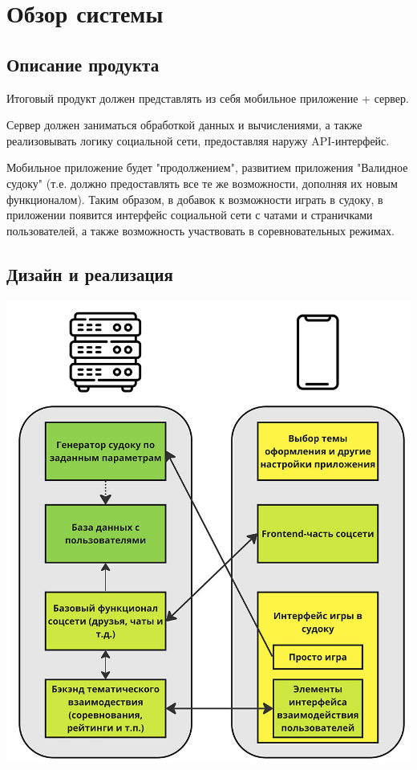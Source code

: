\documentclass{article}
\begin{document}
\section*{Обзор системы}

\subsection*{Описание продукта}
Итоговый продукт должен представлять из себя мобильное приложение + сервер. 

Сервер должен заниматься обработкой данных и вычислениями, а также реализовывать логику социальной сети, предоставляя наружу API-интерфейс. 

Мобильное приложение будет "продолжением", развитием приложения "Валидное судоку" (т.е. должно предоставлять все те же возможности, дополняя их новым функционалом). Таким образом, в добавок к возможности играть в судоку, в приложении появится интерфейс социальной сети с чатами и страничками пользователей, а также возможность участвовать в соревновательных режимах.

\subsection*{Дизайн и реализация}

\includegraphics[scale=0.3]{scheme.jpg}
\end{document}
